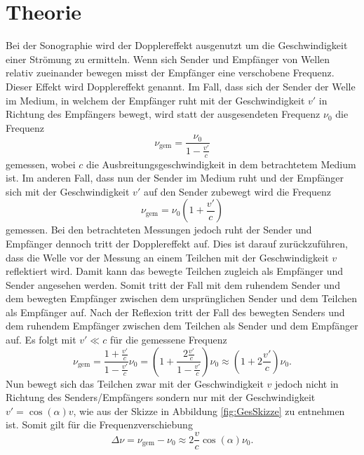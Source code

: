 
\section{Theorie}
\label{sec:Theorie}

Bei der Sonographie wird der Dopplereffekt ausgenutzt um die Geschwindigkeit einer Strömung zu ermitteln.
Wenn sich Sender und Empfänger von Wellen relativ zueinander bewegen misst der Empfänger eine verschobene Frequenz. Dieser Effekt wird Dopplereffekt genannt. Im Fall, dass sich der Sender der Welle im Medium, in welchem der Empfänger ruht mit der Geschwindigkeit $v'$ in Richtung des Empfängers bewegt, wird statt der ausgesendeten Frequenz $\nu_0$ die Frequenz
\begin{equation}
	\nu_\text{gem}=\frac{\nu_0}{1-\frac{v'}{c}}
\end{equation}
gemessen, wobei $c$ die Ausbreitungsgeschwindigkeit in dem betrachtetem Medium ist. Im anderen Fall, dass nun der Sender im Medium ruht und der Empfänger sich mit der Geschwindigkeit $v'$ auf den Sender zubewegt wird die Frequenz
\begin{equation}
	\nu_\text{gem}=\nu_0(1+\frac{v'}{c})
\end{equation}
gemessen. Bei den betrachteten Messungen jedoch ruht der Sender und Empfänger dennoch tritt der Dopplereffekt auf. Dies ist darauf zurückzuführen, dass die Welle vor der Messung an einem Teilchen mit der Geschwindigkeit $v$ reflektiert wird. Damit kann das bewegte Teilchen zugleich als Empfänger und Sender angesehen werden. Somit tritt der Fall mit dem ruhendem Sender und dem bewegten Empfänger zwischen dem ursprünglichen Sender und dem Teilchen als Empfänger auf. Nach der Reflexion tritt der Fall des bewegten Senders und dem ruhendem Empfänger zwischen dem Teilchen als Sender und dem Empfänger auf. Es folgt mit $v' \ll c$ für die gemessene Frequenz
\begin{equation}
	\nu_\text{gem}=\frac{1+\frac{v'}{c}}{1-\frac{v'}{c}} \nu_0=\left(1+\frac{2\frac{v'}{c}}{1-\frac{v'}{c}}\right) \nu_0\approx \left(1+2\frac{v'}{c}\right) \nu_0 \text{.}
\end{equation}
Nun bewegt sich das Teilchen zwar mit der Geschwindigkeit $v$ jedoch nicht in Richtung des Senders/Empfängers sondern nur mit der Geschwindigkeit $v'= \cos(\alpha) v$, wie aus der Skizze in Abbildung \ref{fig:GesSkizze} zu entnehmen ist. Somit gilt für die Frequenzverschiebung
\begin{equation}
	\Delta \nu = \nu_\text{gem}-\nu_0 \approx 2 \frac{v}{c} \cos(\alpha) \nu_0 \text{.}
\end{equation}
